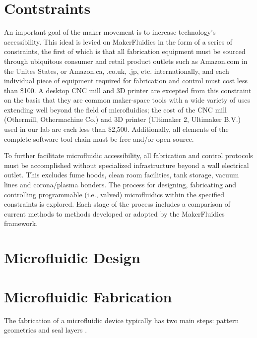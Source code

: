 \section{Contstraints}
\label{sec:mfConstraints}
An important goal of the maker movement is to increase technology's accessibility. This ideal is levied on MakerFluidics in the form of a series of constraints, the first of which is that all fabrication equipment must be sourced through ubiquitous consumer and retail product outlets such as Amazon.com in the Unites States, or Amazon.ca, .co.uk, .jp, etc. internationally, and each individual piece of equipment required for fabrication and control must cost less than \$100. A desktop CNC mill and 3D printer are excepted from this constraint on the basis that they are common maker-space tools with a wide variety of uses extending well beyond the field of microfluidics; the cost of the CNC mill (Othermill, Othermachine Co.) and 3D printer (Ultimaker 2, Ultimaker B.V.) used in our lab are each less than \$2,500. Additionally, all elements of the complete software tool chain must be free and/or open-source. 

To further facilitate microfluidic accessibility, all fabrication and control protocols must be accomplished without specialized infrastructure beyond a wall electrical outlet. This excludes fume hoods, clean room facilities, tank storage, vacuum lines and corona/plasma bonders. The process for designing, fabricating and controlling programmable (i.e., valved) microfluidics within the specified constraints is explored. Each stage of the process includes a comparison of current methods to methods developed or adopted by the MakerFluidics framework. 

\section{Microfluidic Design}
\label{sec:mfDesign}

\section{Microfluidic Fabrication}
\label{sec:mfFabrication}
The fabrication of a microfluidic device typically has two main steps: pattern geometries and seal layers \cite{mcdonald2002poly}.

